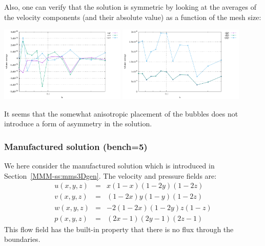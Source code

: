Also, one can verify that the solution is symmetric by looking at the averages of the 
velocity components (and their absolute value) as a function of the mesh size:
\begin{center}
\includegraphics[width=6cm]{python_codes/fieldstone_82/results/bench4/averages.pdf}
\includegraphics[width=6cm]{python_codes/fieldstone_82/results/bench4/averages_abs.pdf}
\end{center}
It seems that the somewhat anisotropic placement of the bubbles does not introduce 
a form of asymmetry in the solution.

\subsubsection*{Manufactured solution (bench=5)}

We here consider the manufactured solution which is introduced in Section~\ref{MMM-ss:mms3Dgen}.
The velocity and pressure fields are:
\begin{eqnarray}
u(x,y,z) &=& x(1-x)(1-2y)(1-2z)\\
v(x,y,z) &=& (1-2x) y(1-y) (1-2z) \\
w(x,y,z) &=& -2(1-2x)(1-2y)z(1-z) \\
p(x,y,z) &=& (2x-1)(2y-1)(2z-1)
\end{eqnarray}
This flow field has the built-in property that there is no flux through the 
boundaries.

